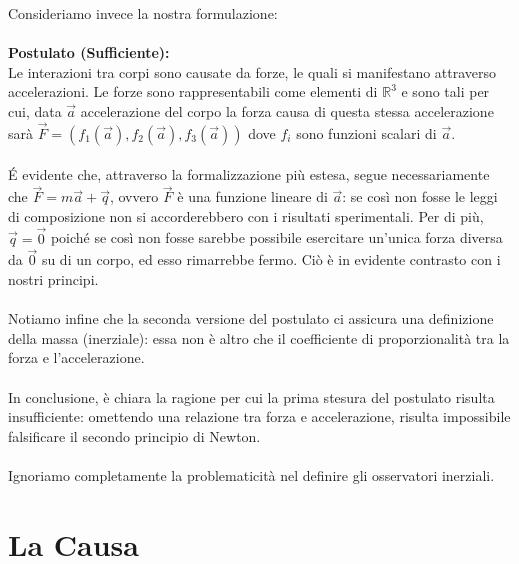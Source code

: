 \documentclass[]{article}
\begin{document}
	Consideriamo invece la nostra formulazione:\\\\
	\textbf{Postulato (Sufficiente):}\\
	Le interazioni tra corpi sono causate da forze, le quali si manifestano attraverso accelerazioni. Le forze sono rappresentabili come elementi di $\mathbb{R}^3$ e sono tali per cui, data $\vec{a}$ accelerazione del corpo la forza causa di questa stessa accelerazione sarà $\vec{F}=(f_1(\vec{a}),f_2(\vec{a}),f_3(\vec{a}))$ dove $f_i$ sono funzioni scalari di $\vec{a}$.
	\\\\
	\' E evidente che, attraverso la formalizzazione più estesa, segue necessariamente che $\vec{F}=m\vec{a}+\vec{q}$, ovvero $\vec{F}$ è una funzione lineare di $\vec{a}$: se così non fosse le leggi di composizione non si accorderebbero con i risultati sperimentali. Per di più, $\vec{q}=\vec{0}$ poiché se così non fosse sarebbe possibile esercitare un'unica forza diversa da $\vec{0}$ su di un corpo, ed esso rimarrebbe fermo. Ciò è in evidente contrasto con i nostri principi.\\
	\\
	Notiamo infine che la seconda versione del postulato ci assicura una definizione della massa (inerziale): essa non è altro che il coefficiente di proporzionalità tra la forza e l'accelerazione.
	\\\\
	In conclusione, è chiara la ragione per cui la prima stesura del postulato risulta insufficiente: omettendo una relazione tra forza e accelerazione, risulta impossibile falsificare il secondo principio di Newton.
	\\\\
	Ignoriamo completamente la problematicità nel definire gli osservatori inerziali. 
	\section{La Causa}
	
\end{document}
